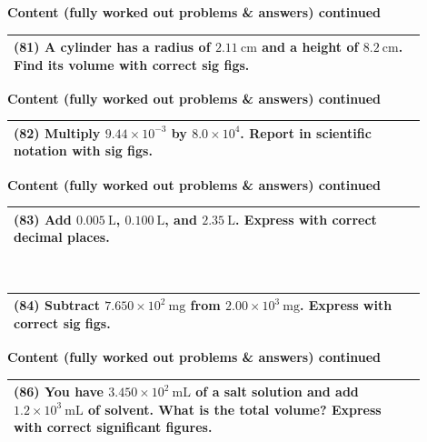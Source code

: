 \documentclass{article}
\begin{document}
\noindent
{\large \textbf{Content (fully worked out problems \& answers) continued}} \\[0.2em]
\begin{tabular}{|p{0.9\linewidth}|}
\hline
\vspace{0.2cm}
\textbf{(81)} A cylinder has a radius of $2.11~\text{cm}$ and a height of $8.2~\text{cm}$. Find its volume with correct sig figs. \\
\hline
\end{tabular}
\newpage

\noindent
{\large \textbf{Content (fully worked out problems \& answers) continued}} \\[0.2em]
\begin{tabular}{|p{0.9\linewidth}|}
\hline
\vspace{0.2cm}
\textbf{(82)} Multiply $9.44 \times 10^{-3}$ by $8.0 \times 10^4$. Report in scientific notation with sig figs. \\
\hline
\end{tabular}
\newpage

\noindent
{\large \textbf{Content (fully worked out problems \& answers) continued}} \\[0.2em]
\begin{tabular}{|p{0.9\linewidth}|}
\hline
\vspace{0.2cm}
\textbf{(83)} Add $0.005~\text{L}$, $0.100~\text{L}$, and $2.35~\text{L}$. Express with correct decimal places. \\
\hline
\end{tabular}
\newpage

\noindent
{\large \textbf{}} \\[0.2em]
\begin{tabular}{|p{0.9\linewidth}|}
\hline
\vspace{0.2cm}
\textbf{(84)} Subtract $7.650 \times 10^2~\text{mg}$ from $2.00 \times 10^3~\text{mg}$. Express with correct sig figs. \\
\hline
\end{tabular}
\newpage

\noindent
{\large \textbf{Content (fully worked out problems \& answers) continued}} \\[0.2em]
\begin{tabular}{|p{0.9\linewidth}|}
\hline
\vspace{0.2cm}
\textbf{(86)} You have $3.450\times10^{2}~\text{mL}$ of a salt solution and add $1.2\times10^{3}~\text{mL}$ of solvent. What is the total volume? Express with correct significant figures. \\
\hline
\end{tabular}
\newpage
\end{document}
